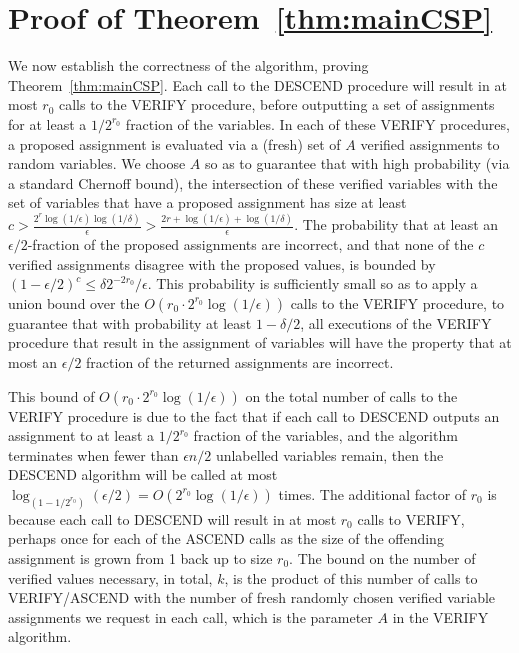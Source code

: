 \documentclass[final,12pt]{colt2018}
\newcommand{\eps}{\epsilon}
\begin{document}
\iffalse

\section{Proof of Theorem~\ref{thm:mainCSP}}

We now establish the correctness of the algorithm, proving Theorem~\ref{thm:mainCSP}.    Each call to the DESCEND procedure will result in at most $r_0$ calls to the VERIFY procedure, before outputting a set of assignments for at least a $1/2^{r_0}$ fraction of the variables.   In each of these VERIFY procedures, a proposed assignment is evaluated via a (fresh) set of $A$ verified assignments to random variables.   We choose $A$ so as to guarantee that with high probability (via a standard Chernoff bound), the intersection of these verified variables with the set of variables that have a proposed assignment has size at least $c > \frac{2^r\log(1/\eps)\log(1/\delta)}{\eps}>\frac{2r+\log(1/\eps)+\log(1/\delta)}{\eps}$.   The probability that at least an $\eps/2$-fraction of the proposed assignments are incorrect, and that none of the $c$ verified assignments disagree with the proposed values, is bounded by $(1-\eps/2)^c \le \delta 2^{-2r_0}/\eps.$ This probability is sufficiently small so as to apply a union bound over the $O(r_0\cdot 2^{r_0}\log(1/\eps))$ calls to the VERIFY procedure, to guarantee that with probability at  least $1-\delta/2$, all executions of the VERIFY procedure that result in the assignment of variables will have the property that at most an $\eps/2$ fraction of the returned assignments are incorrect.    

This bound of $O(r_0\cdot 2^{r_0}\log(1/\eps))$ on the total number of calls to the VERIFY procedure is due to the fact that if each call to DESCEND outputs an assignment to at least a $1/2^{r_0}$ fraction of the variables, and the algorithm terminates when fewer than $\eps n /2$ unlabelled variables remain, then the DESCEND algorithm will be called at most $\log_{(1-1/2^{r_0})} (\eps/2) = O(2^{r_0} \log(1/\eps))$ times.  The additional factor of $r_0$ is because each call to DESCEND will result in at most $r_0$ calls to VERIFY, perhaps once for each of the ASCEND calls as the size of the offending assignment is grown from 1 back up to size $r_0$.   The bound on the number of verified values necessary, in total, $k$, is the product of this number of calls to VERIFY/ASCEND with the number of fresh randomly chosen verified variable assignments we request in each call, which is the parameter $A$ in the VERIFY algorithm.
\end{document}
